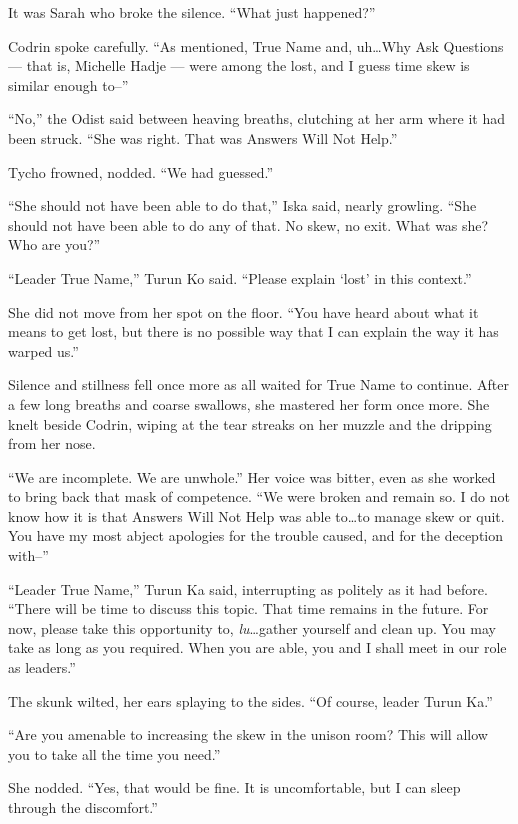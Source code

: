 It was Sarah who broke the silence. ``What just happened?''

Codrin spoke carefully. ``As mentioned, True Name and, uh\ldots Why Ask Questions — that is, Michelle Hadje — were among the lost, and I guess time skew is similar enough to--''

``No,'' the Odist said between heaving breaths, clutching at her arm where it had been struck. ``She was right. That was Answers Will Not Help.''

Tycho frowned, nodded. ``We had guessed.''

``She should not have been able to do that,'' Iska said, nearly growling. ``She should not have been able to do any of that. No skew, no exit. What was she? Who are you?''

``Leader True Name,'' Turun Ko said. ``Please explain `lost' in this context.''

She did not move from her spot on the floor. ``You have heard about what it means to get lost, but there is no possible way that I can explain the way it has warped us.''

Silence and stillness fell once more as all waited for True Name to continue. After a few long breaths and coarse swallows, she mastered her form once more. She knelt beside Codrin, wiping at the tear streaks on her muzzle and the dripping from her nose.

``We are incomplete. We are unwhole.'' Her voice was bitter, even as she worked to bring back that mask of competence. ``We were broken and remain so. I do not know how it is that Answers Will Not Help was able to\ldots to manage skew or quit. You have my most abject apologies for the trouble caused, and for the deception with--''

``Leader True Name,'' Turun Ka said, interrupting as politely as it had before. ``There will be time to discuss this topic. That time remains in the future. For now, please take this opportunity to, \emph{lu}\ldots gather yourself and clean up. You may take as long as you required. When you are able, you and I shall meet in our role as leaders.''

The skunk wilted, her ears splaying to the sides. ``Of course, leader Turun Ka.''

``Are you amenable to increasing the skew in the unison room? This will allow you to take all the time you need.''

She nodded. ``Yes, that would be fine. It is uncomfortable, but I can sleep through the discomfort.''

